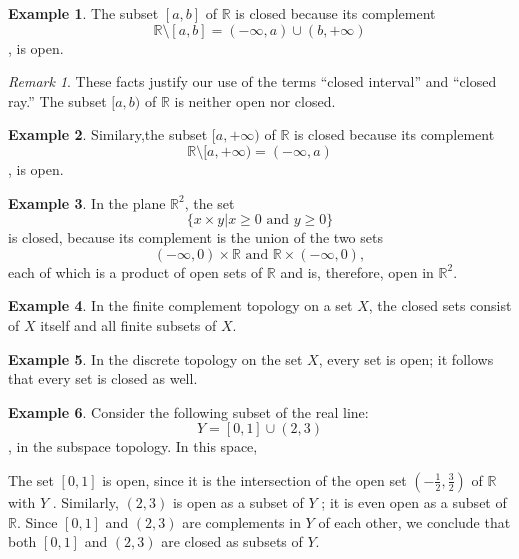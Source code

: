 \documentclass[
]{book}
\theoremstyle{definition}
\theoremstyle{definition}
\newtheorem{example}{Example}[chapter]
\theoremstyle{definition}
\theoremstyle{definition}
\theoremstyle{remark}
\newtheorem*{remark}{Remark}
\begin{document}
\begin{example}
\protect\hypertarget{exm:unnamed-chunk-52}{}\label{exm:unnamed-chunk-52}The subset \([a, b]\) of \(\mathbb{R}\) is closed because its complement
\[\mathbb{R}\setminus [a, b] = (−\infty, a) \cup (b, +\infty)\],
is open.
\end{example}

\begin{remark}
These facts justify our use of the terms ``closed interval'' and ``closed ray.'' The subset \([a, b)\) of \(\mathbb{R}\) is neither open nor closed.
\end{remark}

\begin{example}
\protect\hypertarget{exm:unnamed-chunk-54}{}\label{exm:unnamed-chunk-54}Similary,the subset \([a, +\infty)\) of \(\mathbb{R}\) is closed because its complement
\[\mathbb{R}\setminus [a, +\infty) = (−\infty, a) \],
is open.
\end{example}

\begin{example}
\protect\hypertarget{exm:unnamed-chunk-55}{}\label{exm:unnamed-chunk-55}In the plane \(\mathbb{R}^2\), the set
\[\{x \times y | x \geq 0 \text{ and }y ≥ 0\}\]
is closed, because its complement is the union of the two sets
\[(−\infty, 0) \times \mathbb{R} \text { and }\mathbb{R} \times (−\infty, 0),\]
each of which is a product of open sets of \(\mathbb{R}\) and is, therefore, open in \(\mathbb{R}^2\).
\end{example}

\begin{example}
\protect\hypertarget{exm:unnamed-chunk-56}{}\label{exm:unnamed-chunk-56}In the finite complement topology on a set \(X\), the closed sets consist of \(X\) itself and all finite subsets of \(X\).
\end{example}

\begin{example}
\protect\hypertarget{exm:unnamed-chunk-57}{}\label{exm:unnamed-chunk-57}In the discrete topology on the set \(X\), every set is open; it follows that every set is closed as well.
\end{example}

\begin{example}
\protect\hypertarget{exm:unnamed-chunk-58}{}\label{exm:unnamed-chunk-58}Consider the following subset of the real line:
\[Y = [0, 1] \cup (2, 3)\],
in the subspace topology. In this space,

The set \([0, 1]\) is open, since it is the intersection of the open set \((−\frac{1}{2} , \frac{3}{2} )\) of \(\mathbb{R}\) with \(Y\) . Similarly, \((2, 3)\) is open as a subset of \(Y\) ; it is even open as a subset of \(\mathbb{R}\). Since \([0, 1]\) and \((2, 3)\) are complements in \(Y\) of each other, we conclude that both \([0, 1]\) and \((2, 3)\) are closed as subsets of \(Y\).
\end{example}
\end{document}
